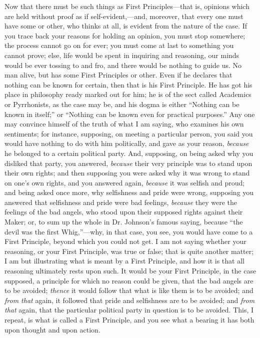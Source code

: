 Now that there must be such things as First
Principles—that is, opinions which are held without
proof as if self-evident,—and, moreover, that every
one must have some or other, who thinks at all, is
evident from the nature of the case. If you trace back
your reasons for holding an opinion, you must stop
somewhere; the process cannot go on for ever; you must
come at last to something you cannot prove; else, life
would be spent in inquiring and reasoning, our minds
would be ever tossing to and fro, and there would be
nothing to guide us. No man alive, but has some First
Principles or other. Even if he declares that nothing can
be known for certain, then that is his First Principle.
He has got his place in philosophy ready marked out for
him; he is of the sect called Academics or Pyrrhonists,
as the case may be, and his dogma is either ``Nothing
can be known in itself;'' or ``Nothing can be
known even for practical purposes.'' Any one may
convince himself of the truth of what I am saying, who
examines his own sentiments; for instance, supposing, on
meeting a particular person, you said you would have
nothing to do with him politically, and gave as your
reason, \emph{because} he belonged to a certain
political party. And, supposing, on being asked why you
disliked that party, you answered, \emph{because} their
very principle was to stand upon their own rights; and
then supposing you were asked why it was wrong to stand
on one's own rights, and you answered again, \emph{because}
it was selfish and proud; and being asked once more, why
selfishness and pride were wrong, supposing you answered
that selfishness and pride were bad feelings, \emph{because}
they were the feelings of the bad angels, who stood upon
their supposed rights against their Maker; or, to sum up
the whole in Dr. Johnson's famous saying, because
``the devil was the first Whig,''—why, in
that case, you see, you would have come to a First
Principle, beyond which you could not get. I am not
saying whether your reasoning, or your First Principle,
was true or false; that is quite another matter; I am but
illustrating what is meant by a First Principle, and how
it is that all reasoning ultimately rests upon such. It
would be your First Principle, in the case supposed, a
principle for which no reason could be given, that the
bad angels are to be avoided; \emph{thence} it would
follow that what is like them is to be avoided; and \emph{from
that} again, it followed that pride and selfishness
are to be avoided; and \emph{from that} again, that the
particular political party in question is to be avoided.
This, I repeat, is what is called a First Principle, and
you see what a bearing it has both upon thought and upon
action.

